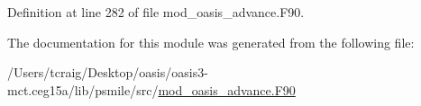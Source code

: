 Definition at line 282 of file mod\+\_\+oasis\+\_\+advance.\+F90.



The documentation for this module was generated from the following file\+:\begin{DoxyCompactItemize}
\item 
/\+Users/tcraig/\+Desktop/oasis/oasis3-\/mct.\+ceg15a/lib/psmile/src/\hyperlink{mod__oasis__advance_8_f90}{mod\+\_\+oasis\+\_\+advance.\+F90}\end{DoxyCompactItemize}
